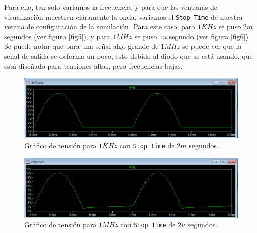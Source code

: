 \documentclass[a4paper]{article} %
\begin{document}
Para ello, tan solo variamos la frecuencia, y para que las ventanas de visualización muestren cláramente la onda, variamos el \texttt{Stop Time} de nuestra vetana de configuración de la simulación. Para este caso, para $1KHz$ se puso $2m$ segundos (ver figura \eqref{fig5}), y para $1MHz$ se puso $1u$ segundo (ver figura \eqref{fig6}). Se puede notar que para una señal algo grande de $1MHz$ se puede ver que la señal de salida se deforma un poco, esto debido al diodo que se está usando, que está diseñado para tensiones altas, pero frecuencias bajas.

\begin{figure} %
	\centering %
	\includegraphics[scale=0.5]{IMAGENES/fig5} %
	\caption{Gráfico de tensión para $1KHz$ con \texttt{Stop Time} de $2m$ segundos.} %
	\label{fig5} %
\end{figure} %

\begin{figure} %
	\centering %
	\includegraphics[scale=0.5]{IMAGENES/fig6} %
	\caption{Gráfico de tensión para $1MHz$ con \texttt{Stop Time} de $2u$ segundos.} %
	\label{fig6} %
\end{figure} %
\end{document}

